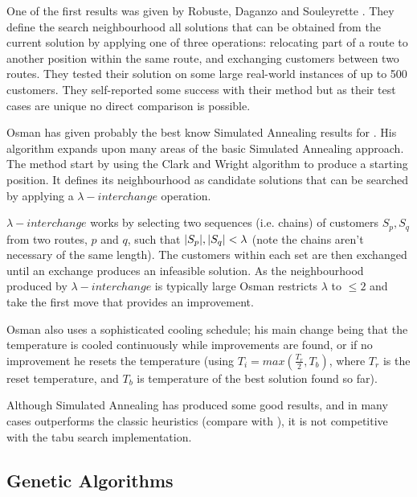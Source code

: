 One of the first results was given by Robuste, Daganzo and Souleyrette \cite{RDS:1990}. They define the search neighbourhood all solutions that can be obtained from the current solution by applying one of three operations: relocating part of a route to another position within the same route, and exchanging customers between two routes. They tested their solution on some large real-world instances of up to 500 customers. They self-reported some success with their method but as their test cases are unique no direct comparison is possible. 

Osman has given probably the best know Simulated Annealing results for \VRP \cite{Osman:1993}. His algorithm expands upon many areas of the basic Simulated Annealing approach. The method start by using the Clark and Wright algorithm to produce a starting position. It defines its neighbourhood as candidate solutions that can be searched by applying a $\lambda-interchange$ operation. 


$\lambda-interchange$ works by selecting two sequences (i.e. chains) of customers $S_p, S_q$ from two routes, $p$ and $q$, such that $|S_p|, |S_q| < \lambda$ (note the chains aren't necessary of the same length). The customers within each set are then exchanged until an exchange produces an infeasible solution. As the neighbourhood produced by $\lambda-interchange$ is typically large Osman restricts $\lambda$ to $\le 2$ and take the first move that provides an improvement. 

Osman also uses a sophisticated cooling schedule; his main change being that the temperature is cooled continuously while improvements are found, or if no improvement he resets the temperature (using $T_i = max(\frac{T_r}{2}, T_b)$, where $T_r$ is the reset temperature, and $T_b$ is temperature of the best solution found so far). 

Although Simulated Annealing has produced some good results, and in many cases outperforms the classic heuristics (compare \cite{Laporte:1999} with \cite{GLP:1999}), it is not competitive with the tabu search implementation. 

\subsection{Genetic Algorithms}


